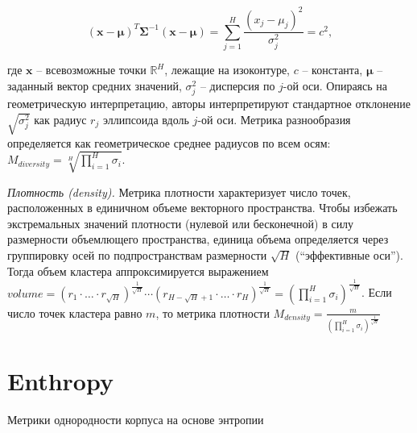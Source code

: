\[(\bm{x}-\bm{\mu})^T\bm{\Sigma}^{-1}(\bm{x}-\bm{\mu}) = \sum_{j=1}^{H}\frac{(x_j-\mu_j)^2}{\sigma_j^2} = c^2,\]

\noindent где $\bm{x}$ -- всевозможные точки $\mathbb{R}^H$, лежащие на изоконтуре, $c$ -- константа, $\bm{\mu}$ -- заданный вектор средних значений, $\sigma_j^2$ -- дисперсия по $j$-ой оси. Опираясь на геометрическую интерпретацию, авторы интерпретируют стандартное отклонение $\sqrt{\sigma_j^2}$  как радиус $r_j$ эллипсоида вдоль $j$-ой оси. Метрика разнообразия определяется как геометрическое среднее радиусов по всем осям: $M_{diversity} = \sqrt[H]{\prod_{i=1}^{H}\sigma_i}$.

\textit{Плотность (density).} Метрика плотности характеризует число точек, расположенных в единичном объеме векторного пространства. Чтобы избежать экстремальных значений плотности (нулевой или бесконечной) в силу размерности объемлющего пространства, единица объема определяется через группировку осей по подпространствам размерности $\sqrt{H}$ (``эффективные оси''). Тогда объем кластера аппроксимируется выражением $volume = (r_1 \cdot \ldots \cdot r_{\sqrt{H}})^{\frac{1}{\sqrt{H}}} \cdots (r_{H-\sqrt{H}+1} \cdot \ldots \cdot r_{H})^{\frac{1}{\sqrt{H}}} = (\prod_{i=1}^{H}\sigma_i)^{\frac{1}{\sqrt{H}}}$. Если число точек кластера равно $m$, то метрика плотности $M_{density}=\frac{m}{(\prod_{i=1}^{H}\sigma_i)^{\frac{1}{\sqrt{H}}}}$





\section{Enthropy}

Метрики однородности корпуса на основе энтропии
